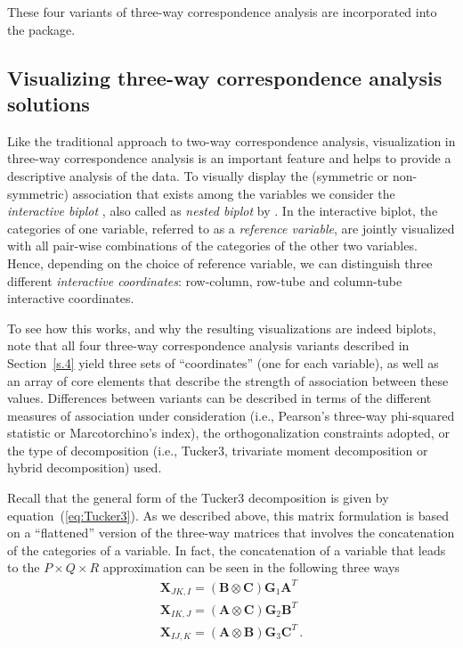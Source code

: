 These four variants of three-way correspondence analysis are incorporated into the  package. 


\subsection {Visualizing three-way correspondence analysis solutions}
\label{s.4.2}

Like the traditional approach to two-way correspondence analysis, visualization in three-way correspondence analysis is an important feature and helps to provide a descriptive analysis of the data. To visually display the (symmetric or non-symmetric) association that exists among the variables we consider the {\it interactive biplot} \cite[]{carkro96}, also called as {\it nested biplot} by \citet[p. 441]{kro08}. In the interactive biplot, the categories of one variable, referred to as a {\it reference variable}, are jointly visualized with all pair-wise combinations of the categories of the other two variables. Hence, depending on the choice of reference variable, we can distinguish three different {\it interactive coordinates}: row-column, row-tube and column-tube interactive coordinates. 

To see how this works, and why the resulting visualizations are indeed biplots, note that all four three-way correspondence analysis variants described in Section~\ref{s.4} yield three sets of ``coordinates'' (one for each variable), as well as an array of core elements that describe the strength of association between these values. Differences between variants can be described in terms of the different measures of association under consideration (i.e., Pearson's three-way phi-squared statistic or Marcotorchino's index), the orthogonalization constraints adopted, or the type of decomposition (i.e., Tucker3, trivariate moment decomposition or hybrid decomposition) used. 

Recall that the general form of the Tucker3 decomposition is given by equation~(\ref{eq:Tucker3}). As we described above, this matrix formulation is based on a ``flattened'' version of the three-way matrices that involves the concatenation of the categories of a variable. In fact, the concatenation of a variable that leads to the $P \times Q \times R$  approximation can be seen in the following three ways
\begin{align}
\label{eq:3biplots}
\mathbf{X}_{JK,I}=\left(\mathbf{ B} \otimes \mathbf{C} \right) \mathbf{G}_1 \mathbf{A}^{T} \nonumber \\
\mathbf{X}_{IK,J}=\left(\mathbf{ A} \otimes \mathbf{C} \right) \mathbf{G}_2 \mathbf{B}^{T}  \\
\mathbf{X}_{IJ,K}=\left(\mathbf{ A} \otimes \mathbf{B} \right) \mathbf{G}_3 \mathbf{C}^{T} \,. \nonumber
\end{align}

